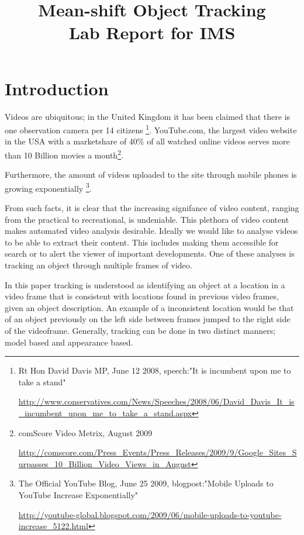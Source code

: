 \documentclass[a4paper,11pt]{article}
\title{Mean-shift Object Tracking\\ Lab Report for IMS}
\date{}
\begin{document}
\maketitle 

\section{Introduction}

	Videos are ubiquitous; in the United Kingdom it has been claimed that there is one observation camera per 14 citizens \footnote{

Rt Hon David Davis MP, June 12 2008, speech:"It is incumbent upon me to take a stand" 

\url{http://www.conservatives.com/News/Speeches/2008/06/David_Davis_It_is_incumbent_upon_me_to_take_a_stand.aspx}

}. YouTube.com, the largest video website in the USA with a marketshare of 40\% of all watched online videos serves more than 10 Billion movies a month\footnote{comScore Video Metrix, August 2009 

\url{http://comscore.com/Press_Events/Press_Releases/2009/9/Google_Sites_Surpasses_10_Billion_Video_Views_in_August}}.

	Furthermore, the amount of videos uploaded to the site through mobile phones is growing exponentially \footnote{The Official YouTube Blog, June 25 2009, blogpost:"Mobile Uploads to YouTube Increase Exponentially" 

\url{http://youtube-global.blogspot.com/2009/06/mobile-uploads-to-youtube-increase_5122.html}}. 

	From such facts, it is clear that the increasing signifance of video content, ranging from the practical to recreational, is undeniable. This plethora of video content makes automated video analysis desirable. Ideally we would like to analyse videos to be able to extract their content. This includes making them accessible for search or to alert the viewer of important developments. One of these analyses is tracking an object through multiple frames of video.



In this paper tracking is understood as identifying an object at a location in a video frame that is consistent with locations found in previous video frames, given an object description. An example of a inconsistent location would be that of an object previously on the left side between frames jumped to the right side of the videoframe. Generally, tracking can be done in two distinct manners; model based and appearance based. 
\end{document}
